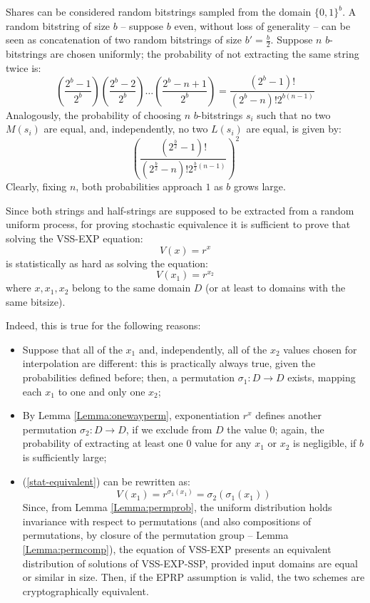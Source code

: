 \documentclass[10pt,journal,cspaper,compsoc]{IEEEtran}
\begin{document}
\begin{IEEEproof}
Shares can be considered random bitstrings sampled from the domain $\{0,1\}^b$. A random bitstring of size $b$ -- suppose $b$ even, without loss of generality -- can be seen as concatenation of two random bitstrings of size $b'=\frac{b}{2}$.
Suppose $n$ $b$-bitstrings are chosen uniformly; the probability of not extracting the same string twice is:
$$ \left(\frac{2^b-1}{2^b}\right) \left(\frac{2^b-2}{2^b}\right) \ldots \left(\frac{2^b-n+1}{2^b}\right) = \dfrac{(2^b-1)!}{(2^b-n)!2^{b(n-1)}}$$
Analogously, the probability of choosing $n$ $b$-bitstrings $s_i$ such that no two $M(s_i)$ are equal, and, independently, no two $L(s_i)$ are equal, is given by:
$$ \left(\dfrac{(2^{\frac{b}{2}}-1)!}{(2^{\frac{b}{2}}-n)!2^{{\frac{b}{2}}(n-1)}}\right)^2 $$
Clearly, fixing $n$, both probabilities approach $1$ as $b$ grows large.

Since both strings and half-strings are supposed to be extracted from a random uniform process, for proving stochastic equivalence it is sufficient to prove that solving the VSS-EXP equation:
\begin{equation}
V(x) = r^x
\end{equation}
is statistically as hard as solving the equation:
\begin{equation}
\label{stat-equivalent}
V(x_1) = r^{x_2}
\end{equation}
where $x,x_1,x_2$ belong to the same domain $D$ (or at least to domains with the same bitsize).

Indeed, this is true for the following reasons:

\begin{itemize}
\item Suppose that all of the $x_1$ and, independently, all of the $x_2$ values chosen for interpolation are different: this is practically always true, given the probabilities defined before; then, a permutation ${\sigma_1:D \rightarrow D}$ exists, mapping each $x_1$ to one and only one $x_2$;
\item By Lemma \ref{Lemma:onewayperm}, exponentiation $r^x$ defines another permutation ${\sigma_2:D\rightarrow D}$, if we exclude from $D$ the value $0$; again, the probability of extracting at least one $0$ value for any $x_1$ or $x_2$ is negligible, if $b$ is sufficiently large;
\item (\ref{stat-equivalent}) can be rewritten as:
\begin{equation}
V(x_1) = r^{\sigma_1(x_1)} = \sigma_2(\sigma_1(x_1))
\end{equation}
Since, from Lemma \ref{Lemma:permprob}, the uniform distribution holds invariance with respect to permutations (and also compositions of permutations, by closure of the permutation group -- Lemma \ref{Lemma:permcomp}), the equation of VSS-EXP presents an equivalent distribution of solutions of VSS-EXP-SSP, provided input domains are equal or similar in size. Then, if the EPRP assumption is valid, the two schemes are cryptographically equivalent.
\end{itemize}
\end{IEEEproof}
\end{document}

